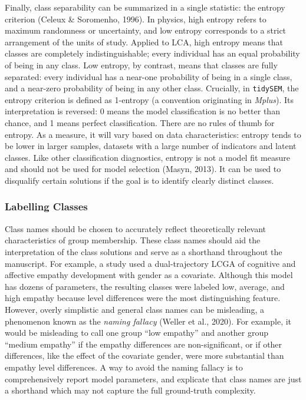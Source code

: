 \documentclass[
  ,man,floatsintext]{apa6}
\begin{document}
Finally, class separability can be summarized in a single statistic:
the entropy criterion (Celeux \& Soromenho, 1996).
In physics, high entropy refers to maximum randomness or uncertainty,
and low entropy corresponds to a strict arrangement of the units of study.
Applied to LCA, high entropy means that classes are completely indistinguishable;
every individual has an equal probability of being in any class.
Low entropy, by contrast, means that classes are fully separated: every individual has a near-one probability of being in a single class, and a near-zero probability of being in any other class.
Crucially, in \texttt{tidySEM}, the entropy criterion is defined as 1-entropy (a convention originating in \emph{Mplus}).
Its interpretation is reversed:
0 means the model classification is no better than chance,
and 1 means perfect classification.
There are no rules of thumb for entropy. As a measure, it will vary based on data characteristics:
entropy tends to be lower in larger samples, datasets with a large number of indicators and latent classes.
Like other classification diagnostics,
entropy is not a model fit measure and should not be used for model selection (Masyn, 2013).
It can be used to disqualify certain solutions if the goal is to identify clearly distinct classes.

\hypertarget{labelling-classes}{%
\subsubsection{Labelling Classes}\label{labelling-classes}}

Class names should be chosen to accurately reflect theoretically relevant characteristics of group membership.
These class names should aid the interpretation of the class solutions and serve as a shorthand throughout the manuscript.
For example, a study used a dual-trajectory LCGA of cognitive and affective empathy development with gender as a covariate.
Although this model has dozens of parameters,
the resulting classes were labeled low, average, and high empathy because level differences were the most distinguishing feature.
However, overly simplistic and general class names can be misleading, a phenomenon known as the \emph{naming fallacy} (Weller et al., 2020).
For example, it would be misleading to call one group ``low empathy'' and another group ``medium empathy'' if the empathy differences are non-significant,
or if other differences, like the effect of the covariate gender, were more substantial than empathy level differences.
A way to avoid the naming fallacy is to comprehensively report model parameters,
and explicate that class names are just a shorthand which may not capture the full ground-truth complexity.
\end{document}
